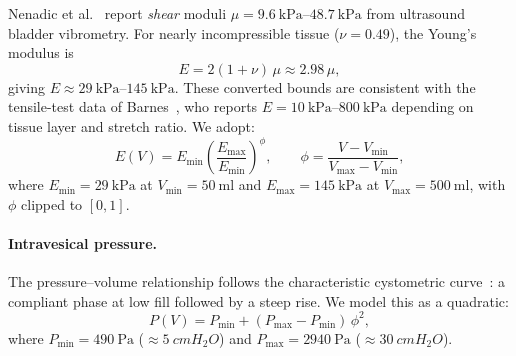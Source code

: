 Nenadic et al.~\cite{Nenadic2013} report \emph{shear} moduli
$\mu = \SIrange{9.6}{48.7}{\kilo\pascal}$ from ultrasound bladder vibrometry.
For nearly incompressible tissue ($\nu = 0.49$), the Young's modulus is
\begin{equation}\label{eq:E_mu}
  E = 2(1 + \nu)\,\mu \approx 2.98\,\mu,
\end{equation}
giving $E \approx \SIrange{29}{145}{\kilo\pascal}$.  These converted bounds
are consistent with the tensile-test data of Barnes~\cite{Barnes2016}, who
reports $E = \SIrange{10}{800}{\kilo\pascal}$ depending on tissue layer and
stretch ratio.  We adopt:
\begin{equation}\label{eq:E_fill}
  E(V) = E_\mathrm{min} \left(\frac{E_\mathrm{max}}{E_\mathrm{min}}\right)^{\phi},
  \qquad \phi = \frac{V - V_\mathrm{min}}{V_\mathrm{max} - V_\mathrm{min}},
\end{equation}
where $E_\mathrm{min} = \SI{29}{\kilo\pascal}$ at $V_\mathrm{min} =
\SI{50}{\milli\litre}$ and $E_\mathrm{max} = \SI{145}{\kilo\pascal}$ at
$V_\mathrm{max} = \SI{500}{\milli\litre}$, with $\phi$ clipped to $[0, 1]$.

\paragraph{Intravesical pressure.}
The pressure--volume relationship follows the characteristic cystometric
curve~\cite{Griffiths1980}: a compliant phase at low fill followed by a
steep rise.  We model this as a quadratic:
\begin{equation}\label{eq:P_fill}
  P(V) = P_\mathrm{min} + (P_\mathrm{max} - P_\mathrm{min})\,\phi^2,
\end{equation}
where $P_\mathrm{min} = \SI{490}{\pascal}$ ($\approx \SI{5}{cmH_2O}$) and
$P_\mathrm{max} = \SI{2940}{\pascal}$ ($\approx \SI{30}{cmH_2O}$).

